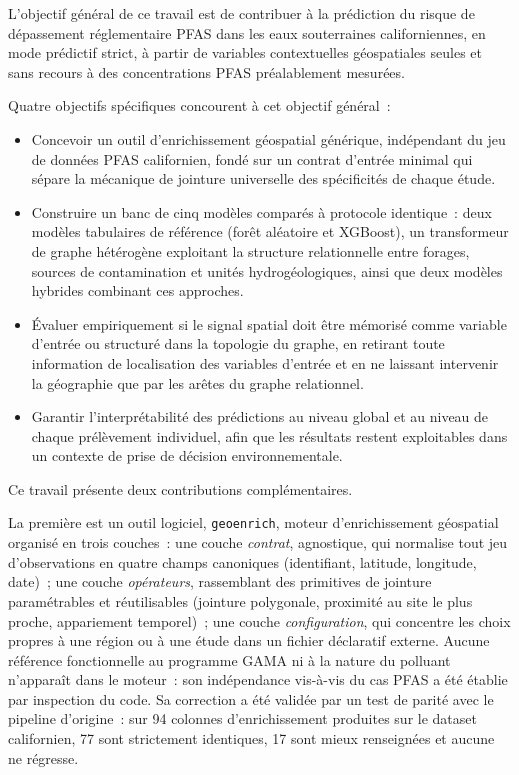 \label{sec:intro-objectifs}

L'objectif g\'en\'eral de ce travail est de contribuer \`a la pr\'ediction du risque de d\'epassement r\'eglementaire PFAS dans les eaux souterraines californiennes, en mode pr\'edictif strict, \`a partir de variables contextuelles g\'eospatiales seules et sans recours \`a des concentrations PFAS pr\'ealablement mesur\'ees.

Quatre objectifs sp\'ecifiques concourent \`a cet objectif g\'en\'eral~:

\begin{itemize}
    \item Concevoir un outil d'enrichissement g\'eospatial g\'en\'erique, ind\'ependant du jeu de donn\'ees PFAS californien, fond\'e sur un contrat d'entr\'ee minimal qui s\'epare la m\'ecanique de jointure universelle des sp\'ecificit\'es de chaque \'etude.
    \item Construire un banc de cinq mod\`eles compar\'es \`a protocole identique~: deux mod\`eles tabulaires de r\'ef\'erence (for\^et al\'eatoire et XGBoost), un transformeur de graphe h\'et\'erog\`ene exploitant la structure relationnelle entre forages, sources de contamination et unit\'es hydrog\'eologiques, ainsi que deux mod\`eles hybrides combinant ces approches.
    \item \'Evaluer empiriquement si le signal spatial doit \^etre m\'emoris\'e comme variable d'entr\'ee ou structur\'e dans la topologie du graphe, en retirant toute information de localisation des variables d'entr\'ee et en ne laissant intervenir la g\'eographie que par les ar\^etes du graphe relationnel.
    \item Garantir l'interpr\'etabilit\'e des pr\'edictions au niveau global et au niveau de chaque pr\'el\`evement individuel, afin que les r\'esultats restent exploitables dans un contexte de prise de d\'ecision environnementale.
\end{itemize}


\label{sec:intro-contribution}

Ce travail pr\'esente deux contributions compl\'ementaires.

La premi\`ere est un outil logiciel, \texttt{geoenrich}, moteur d'enrichissement g\'eospatial organis\'e en trois couches~: une couche \emph{contrat}, agnostique, qui normalise tout jeu d'observations en quatre champs canoniques (identifiant, latitude, longitude, date)~; une couche \emph{op\'erateurs}, rassemblant des primitives de jointure param\'etrables et r\'eutilisables (jointure polygonale, proximit\'e au site le plus proche, appariement temporel)~; une couche \emph{configuration}, qui concentre les choix propres \`a une r\'egion ou \`a une \'etude dans un fichier d\'eclaratif externe. Aucune r\'ef\'erence fonctionnelle au programme GAMA ni \`a la nature du polluant n'appara\^it dans le moteur~: son ind\'ependance vis-\`a-vis du cas PFAS a \'et\'e \'etablie par inspection du code. Sa correction a \'et\'e valid\'ee par un test de parit\'e avec le pipeline d'origine~: sur 94 colonnes d'enrichissement produites sur le dataset californien, 77 sont strictement identiques, 17 sont mieux renseign\'ees et aucune ne r\'egresse.


